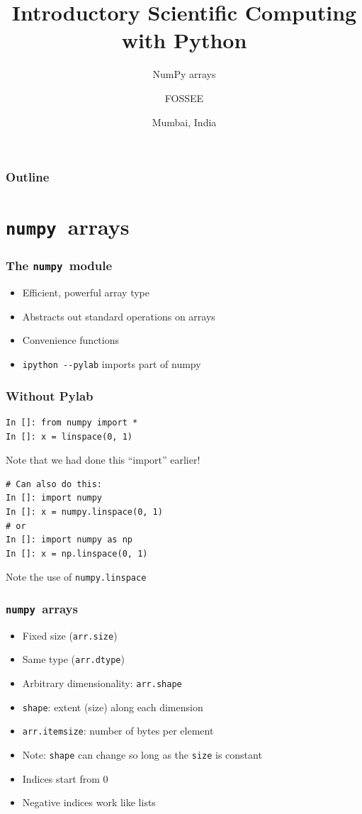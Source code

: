 \documentclass[14pt,compress]{beamer}
\title[NumPy arrays]{Introductory Scientific Computing with
Python}
\subtitle{NumPy arrays}
\author[FOSSEE] {FOSSEE}
\institute[FOSSEE -- IITB] {Department of Aerospace Engineering\\IIT Bombay}
\date[] {Mumbai, India}
\newcommand{\typ}[1]{\lstinline{#1}}
\newcommand{\num}{\texttt{numpy}}
\begin{document}
\begin{frame}
  \titlepage
\end{frame}

\begin{frame}
  \frametitle{Outline}
  \tableofcontents
\end{frame}


\section{\num\ arrays}

\begin{frame}[fragile]
  \frametitle{The \num\ module}
  \begin{itemize}
  \item Efficient, powerful array type
  \item Abstracts out standard operations on arrays
  \item Convenience functions
  \item \typ{ipython --pylab} imports part of numpy
  \end{itemize}
\end{frame}

\begin{frame}[fragile]
  \frametitle{Without Pylab}
\begin{lstlisting}
In []: from numpy import *
In []: x = linspace(0, 1)
\end{lstlisting}
  Note that we had done this ``import'' earlier!
\begin{lstlisting}
# Can also do this:
In []: import numpy
In []: x = numpy.linspace(0, 1)
# or
In []: import numpy as np
In []: x = np.linspace(0, 1)
\end{lstlisting}
  Note the use of \typ{numpy.linspace}
\end{frame}

\begin{frame}
  \frametitle{\num\ arrays}
  \begin{itemize}
  \item Fixed size (\typ{arr.size})
  \item Same type (\typ{arr.dtype})
  \item Arbitrary dimensionality: \typ{arr.shape}
  \item \typ{shape}: extent (size) along each dimension
  \item \typ{arr.itemsize}: number of bytes per element
  \item \alert{Note:} \typ{shape} can change so long as the \typ{size}
      is constant
  \item Indices start from 0
  \item Negative indices work like lists
  \end{itemize}
\end{frame}
\end{document}
